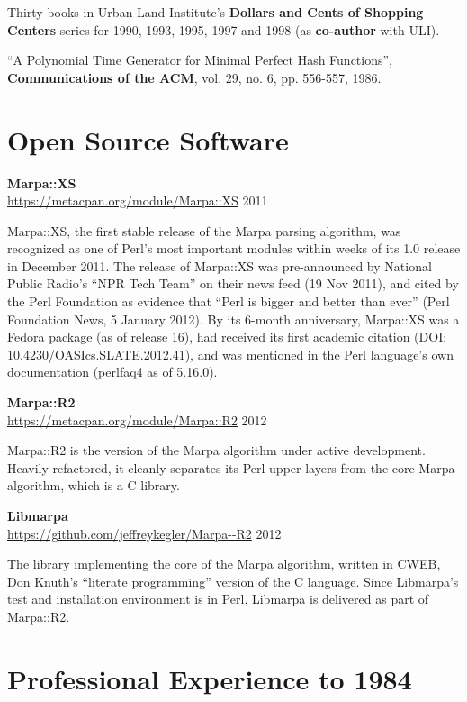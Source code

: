 \documentclass[12pt,margin,line]{res}
\newcommand{\internalskip}{\vspace{-.15in}}
\begin{document}
\begin{resume}
Thirty books in Urban Land Institute's 
{\bf Dollars and Cents of Shopping Centers}
series for 1990, 1993, 1995, 1997 and 1998
(as {\bf co-author}
with ULI).

``A Polynomial Time Generator for Minimal Perfect Hash Functions'',
{\bf Communications of the ACM},
vol.  29, no.  6, pp.  556-557, 1986.

\section{\sc Open Source Software}

{\bf Marpa::XS} \\
\url{https://metacpan.org/module/Marpa::XS} \hfill 2011

\internalskip
Marpa::XS, the first stable release of the Marpa parsing algorithm,
was recognized as one of Perl's most important modules
within weeks of its 1.0 release in December 2011.
The release of Marpa::XS was
pre-announced by National Public Radio's ``NPR Tech Team'' on their
news feed (19 Nov 2011),
and cited by the Perl Foundation as evidence that
``Perl is bigger and better than ever''
(Perl Foundation News, 5 January 2012).
By its 6-month anniversary,
Marpa::XS was a Fedora package (as of release 16),
had received its first academic citation
(DOI: 10.4230/OASIcs.SLATE.2012.41),
and was mentioned in the Perl language's
own documentation (perlfaq4 as of 5.16.0).

{\bf Marpa::R2} \\
\url{https://metacpan.org/module/Marpa::R2} \hfill 2012

\internalskip
Marpa::R2 is the version of the Marpa algorithm under active
development.
Heavily refactored,
it cleanly separates its Perl upper layers
from the core Marpa algorithm, which is a C library.

{\bf Libmarpa} \\
\url{https://github.com/jeffreykegler/Marpa--R2} \hfill 2012

\internalskip
The library implementing the core of the Marpa algorithm,
written in CWEB, Don Knuth's ``literate programming'' version of 
the C language.
Since
Libmarpa's test and installation environment is in Perl,
Libmarpa is delivered as part of Marpa::R2.

\section{\sc Professional Experience {\footnotesize to 1984}}


\end{resume}
\end{document}
